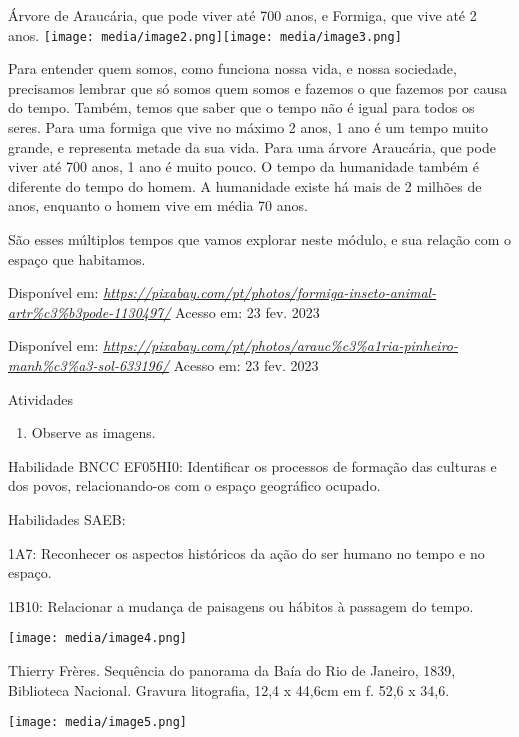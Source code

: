 Árvore de Araucária, que pode viver até 700 anos, e Formiga, que vive
até 2 anos.
\texttt{[image: media/image2.png]}\texttt{[image: media/image3.png]}

Para entender quem somos, como funciona nossa vida, e nossa sociedade,
precisamos lembrar que só somos quem somos e fazemos o que fazemos por
causa do tempo. Também, temos que saber que o tempo não é igual para
todos os seres. Para uma formiga que vive no máximo 2 anos, 1 ano é um
tempo muito grande, e representa metade da sua vida. Para uma árvore
Araucária, que pode viver até 700 anos, 1 ano é muito pouco. O tempo da
humanidade também é diferente do tempo do homem. A humanidade existe há
mais de 2 milhões de anos, enquanto o homem vive em média 70 anos.

São esses múltiplos tempos que vamos explorar neste módulo, e sua
relação com o espaço que habitamos.

Disponível em:
\href{https://pixabay.com/pt/photos/formiga-inseto-animal-artr\%c3\%b3pode-1130497/}{\emph{https://pixabay.com/pt/photos/formiga-inseto-animal-artr\%c3\%b3pode-1130497/}}
Acesso em: 23 fev. 2023

Disponível em:
\href{https://pixabay.com/pt/photos/arauc\%c3\%a1ria-pinheiro-manh\%c3\%a3-sol-633196/}{\emph{https://pixabay.com/pt/photos/arauc\%c3\%a1ria-pinheiro-manh\%c3\%a3-sol-633196/}}
Acesso em: 23 fev. 2023

Atividades

\begin{enumerate}
\def\labelenumi{\arabic{enumi}.}
\item
  Observe as imagens.
\end{enumerate}

Habilidade BNCC EF05HI0: Identificar os processos de formação das
culturas e dos povos, relacionando-os com o espaço geográfico ocupado.

Habilidades SAEB:

1A7: Reconhecer os aspectos históricos da ação do ser humano no tempo e
no espaço.

1B10: Relacionar a mudança de paisagens ou hábitos à passagem do tempo.

\texttt{[image: media/image4.png]}

Thierry Frères. Sequência do panorama da Baía do Rio de Janeiro, 1839,
Biblioteca Nacional. Gravura litografia, 12,4 x 44,6cm em f. 52,6 x
34,6.

\texttt{[image: media/image5.png]}


